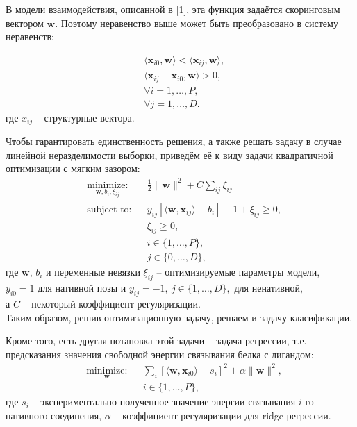 \documentclass[12pt,twoside]{article}
\begin{document}
В модели взаимодействия, описанной в [1], эта функция задаётся скоринговым вектором $\mathbf{w}$. Поэтому неравенство выше может быть преобразовано в систему неравенств:
 
\begin{equation}\label{eq9}
\begin{split}
& \langle\mathbf{x}_{i0}, \mathbf{w}\rangle < \langle\mathbf{x}_{ij}, \mathbf{w}\rangle, \\
& \langle\mathbf{x}_{ij} - \mathbf{x}_{i0}, \mathbf{w}\rangle > 0, \\
& \forall i = 1,\dots, P, \\
& \forall j = 1, \dots, D.
\end{split}
\end{equation}
где $x_{ij}$ -- структурные вектора.  

Чтобы гарантировать единственность решения, а также решать задачу в случае линейной неразделимости выборки, приведём её к виду задачи квадратичной оптимизации с мягким зазором:
\begin{equation}\label{eq10}
\begin{aligned}
& \underset{\mathbf{w}, b_i, \xi_{ij}}{\text{minimize:}}
& & \frac{1}{2} \|\mathbf{w}\|^2 + C\sum\limits_{ij}\xi_{ij} \\
& \text{subject to:}
& & y_{ij}[\langle\mathbf{w},\mathbf{x}_{ij}\rangle - b_i]-1+\xi_{ij} \geq 0, \\
&&& \xi_{ij} \geq 0,\\
&&&i\in\{1,\dots,P\}, \\
&&&j\in\{0,\dots,D\},
\end{aligned}
\end{equation}
где $\mathbf{w}$, $b_i$ и переменные невязки $\xi_{ij}$ -- оптимизируемые параметры модели, \\
$y_{i0}=1$ для нативной позы и $y_{ij}=-1, \ j\in\{1,\dots,D\},$ для ненативной,\\
а $C$ -- некоторый коэффициент регуляризации. \\
Таким образом, решив оптимизационную задачу, решаем и задачу класификации.

Кроме того, есть другая потановка этой задачи -- задача регрессии, т.е. предсказания значения свободной энергии связывания белка с лигандом:
\begin{equation}\label{eq11}
\begin{aligned}
& \underset{\mathbf{w}}{\text{minimize:}}
& & \sum\limits_{i}[\langle\mathbf{w},\mathbf{x}_{i0}\rangle - s_i]^2 + \alpha\|\mathbf{w}\|^2, \\
&&& i\in\{1,\dots,P\},
\end{aligned}
\end{equation}
где $s_i$ -- экспериментально полученное значение энергии связывания $i$-го нативного соединения, $\alpha$ -- коэффициент регуляризации для ridge-регрессии. 
\end{document}
